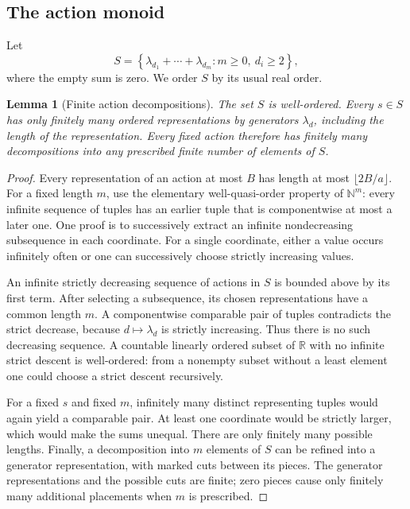 \documentclass[11pt,a4paper]{article}
\numberwithin{equation}{section}
\newtheorem{lemma}[theorem]{Lemma}
\theoremstyle{definition}
\theoremstyle{remark}
\newcommand{\N}{\mathbb N}
\newcommand{\R}{\mathbb R}
\begin{document}
\subsection{The action monoid}

Let
\begin{equation}
 S=\left\{\lambda_{d_1}+\cdots+\lambda_{d_m}:
 m\ge0,\ d_i\ge2\right\},
 \label{eq:S}
\end{equation}
where the empty sum is zero. We order $S$ by its usual real order.

\begin{lemma}[Finite action decompositions]\label{lem:support}
The set $S$ is well-ordered. Every $s\in S$ has only finitely many ordered
representations by generators $\lambda_d$, including the length of the
representation. Every fixed action therefore has finitely many
decompositions into any prescribed finite number of elements of $S$.
\end{lemma}
\begin{proof}
Every representation of an action at most $B$ has length at most
$\lfloor 2B/a\rfloor$. For a fixed length $m$, use the elementary
well-quasi-order property of $\N^m$: every infinite sequence of tuples
has an earlier tuple that is componentwise at most a later one. One proof
is to successively extract an infinite nondecreasing subsequence in each
coordinate. For a single coordinate, either a value occurs infinitely
often or one can successively choose strictly increasing values.

An infinite strictly decreasing sequence of actions in $S$ is bounded
above by its first term. After selecting a subsequence, its chosen
representations have a common length $m$. A componentwise comparable
pair of tuples contradicts the strict decrease, because $d\mapsto
\lambda_d$ is strictly increasing. Thus there is no such decreasing
sequence. A countable linearly ordered subset of $\R$ with no infinite
strict descent is well-ordered: from a nonempty subset without a least
element one could choose a strict descent recursively.

For a fixed $s$ and fixed $m$, infinitely many distinct representing
tuples would again yield a comparable pair. At least one coordinate
would be strictly larger, which would make the sums unequal. There are
only finitely many possible lengths. Finally, a decomposition into
$m$ elements of $S$ can be refined into a generator representation,
with marked cuts between its pieces. The generator representations and
the possible cuts are finite; zero pieces cause only finitely many
additional placements when $m$ is prescribed.
\end{proof}
\end{document}
